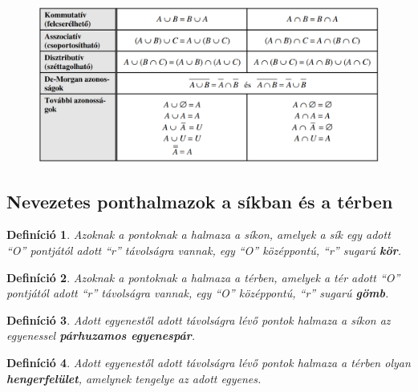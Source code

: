 \documentclass[12pt,a4paper]{article}
\newtheorem{definition}{Definíció} [section]
\begin{document}
\begin{figure}[h]
\centering
\includegraphics[scale=0.35]{img/halmazmuveletek}
\end{figure}

\subsection{Nevezetes ponthalmazok a síkban és a térben}

\begin{definition}
Azoknak a pontoknak a halmaza a síkon, amelyek a sík egy adott ``O'' pontjától adott ``r'' távolságra vannak, egy ``O'' középpontú, ``r'' sugarú \textbf{kör}.
\end{definition}

\begin{definition}
Azoknak a pontoknak a halmaza a térben, amelyek a tér adott ``O'' pontjától adott ``r'' távolságra vannak, egy ``O'' középpontú, ``r'' sugarú \textbf{gömb}.
\end{definition}

\begin{definition}
Adott egyenestől adott távolságra lévő pontok halmaza a síkon az egyenessel \textbf{párhuzamos egyenespár}.
\end{definition}

\begin{definition}
Adott egyenestől adott távolságra lévő pontok halmaza a térben olyan \textbf{hengerfelület}, amelynek tengelye az adott egyenes.
\end{definition}
\end{document}
